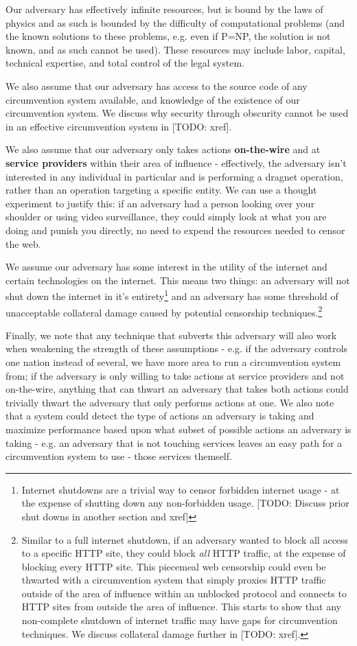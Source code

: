 \documentclass[12pt]{report}
\begin{document}
Our adversary has effectively infinite resources, but is bound by the laws of physics and as such is bounded by the difficulty of computational problems (and the known solutions to these problems, e.g. even if P=NP, the solution is not known, and as such cannot be used). These resources may include labor, capital, technical expertise, and total control of the legal system.

We also assume that our adversary has access to the source code of any circumvention system available, and knowledge of the existence of our circumvention system. We discuss why security through obscurity cannot be used in an effective circumvention system in [TODO: xref].

We also assume that our adversary only takes actions \textbf{on-the-wire} and at \textbf{service providers} within their area of influence - effectively, the adversary isn't interested in any individual in particular and is performing a dragnet operation, rather than an operation targeting a specific entity. We can use a thought experiment to justify this: if an adversary had a person looking over your shoulder or using video surveillance, they could simply look at what you are doing and punish you directly, no need to expend the resources needed to censor the web.

We assume our adversary has some interest in the utility of the internet and certain technologies on the internet. This means two things: an adversary will not shut down the internet in it's entirety\footnote{Internet shutdowns are a trivial way to censor forbidden internet usage - at the expense of shutting down any non-forbidden usage. [TODO: Discuss prior shut downs in another section and xref]} and an adversary has some threshold of unacceptable collateral damage caused by potential censorship techniques.\footnote{Similar to a full internet shutdown, if an adversary wanted to block all access to a specific HTTP site, they could block \emph{all} HTTP traffic, at the expense of blocking every HTTP site. This piecemeal web censorship could even be thwarted with a circumvention system that simply proxies HTTP traffic outside of the area of influence within an unblocked protocol and connects to HTTP sites from outside the area of influence. This starts to show that any non-complete shutdown of internet traffic may have gaps for circumvention techniques. We discuss collateral damage further in [TODO: xref].}

Finally, we note that any technique that subverts this adversary will also work when weakening the strength of these assumptions - e.g. if the adversary controls one nation instead of several, we have more area to run a circumvention system from; if the adversary is only willing to take actions at service providers and not on-the-wire, anything that can thwart an adversary that takes both actions could trivially thwart the adversary that only performs actions at one. We also note that a system could detect the type of actions an adversary is taking and maximize performance based upon what subset of possible actions an adversary is taking - e.g. an adversary that is not touching services leaves an easy path for a circumvention system to use - those services themself.
\end{document}
